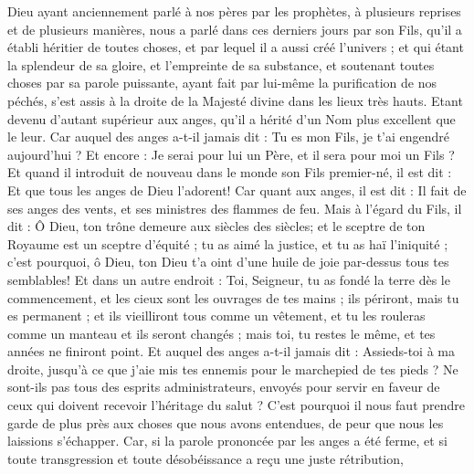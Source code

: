 \begin{multicols}{2}
\VerseOne{}Dieu ayant anciennement parlé à nos pères par les prophètes, à plusieurs reprises et de plusieurs manières,
nous a parlé dans ces derniers jours par son Fils, qu'il a établi héritier de toutes choses, et par lequel il a aussi créé l'univers ;
et qui étant la splendeur de sa gloire, et l'empreinte de sa substance, et soutenant toutes choses par sa parole puissante, ayant fait par lui-même la purification de nos péchés, s'est assis à la droite de la Majesté divine dans les lieux très hauts.
Etant devenu d'autant supérieur aux anges, qu'il a hérité d'un Nom plus excellent que le leur.
Car auquel des anges a-t-il jamais dit : Tu es mon Fils, je t'ai engendré aujourd'hui ? Et encore : Je serai pour lui un Père, et il sera pour moi un Fils ?
Et quand il introduit de nouveau dans le monde son Fils premier-né, il est dit : Et que tous les anges de Dieu l'adorent!
Car quant aux anges, il est dit : Il fait de ses anges des vents, et ses ministres des flammes de feu.
Mais à l'égard du Fils, il dit : Ô Dieu, ton trône demeure aux siècles des siècles; et le sceptre de ton Royaume est un sceptre d'équité ;
tu as aimé la justice, et tu as haï l'iniquité ; c'est pourquoi, ô Dieu, ton Dieu t'a oint d'une huile de joie par-dessus tous tes semblables!
Et dans un autre endroit : Toi, Seigneur, tu as fondé la terre dès le commencement, et les cieux sont les ouvrages de tes mains ;
ils périront, mais tu es permanent ; et ils vieilliront tous comme un vêtement,
et tu les rouleras comme un manteau et ils seront changés ; mais toi, tu restes le même, et tes années ne finiront point.
Et auquel des anges a-t-il jamais dit : Assieds-toi à ma droite, jusqu'à ce que j'aie mis tes ennemis pour le marchepied de tes pieds ?
Ne sont-ils pas tous des esprits administrateurs, envoyés pour servir en faveur de ceux qui doivent recevoir l'héritage du salut ?
\VerseOne{}C'est pourquoi il nous faut prendre garde de plus près aux choses que nous avons entendues, de peur que nous les laissions s'échapper.
Car, si la parole prononcée par les anges a été ferme, et si toute transgression et toute désobéissance a reçu une juste rétribution,

\end{multicols}
